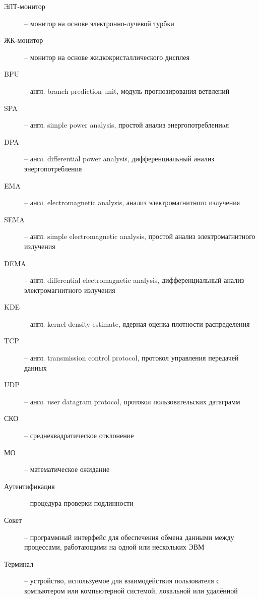 
\begin{description}
\item[ЭЛТ-монитор] -- монитор на основе электронно-лучевой турбки
\item[ЖК-монитор] -- монитор на основе жидкокристаллического дисплея
\item[BPU] -- англ. branch prediction unit, модуль прогнозирования ветвлений
\item[SPA] -- англ. simple power analysis, простой анализ энергопотреблениaя
\item[DPA] -- англ. differential power analysis, дифференциальный анализ
  энергопотребления
\item[EMA] -- англ. electromagnetic analysis, анализ электромагнитного
  излучения
\item[SEMA] -- англ. simple electromagnetic analysis, простой анализ
  электромагнитного излучения
\item[DEMA] -- англ. differential electromagnetic analysis, дифференциальный
  анализ электромагнитного излучения
\item[KDE] -- англ. kernel density estimate, ядерная оценка плотности распределения
\item[TCP] -- англ. transmission control protocol, протокол управления передачей данных
\item[UDP] -- англ. user datagram protocol, протокол пользовательских датаграмм
\item[СКО] -- среднеквадратическое отклонение
\item[МО] -- математическое ожидание
\end{description}

\clearpage


\begin{description}
\item[Аутентификация] -- процедура проверки подлинности
\item[Сокет] -- программный интерфейс для обеспечения обмена данными между процессами, работающими на одной или нескольких ЭВМ
\item[Терминал] -- устройство, используемое для взаимодействия пользователя с компьютером или компьютерной системой, локальной или удалённой
\end{description}

\clearpage
